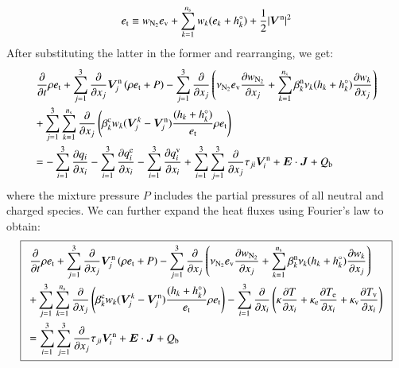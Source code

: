 \documentclass{warpdoc}
\newcommand\frameeqn[1]{\fbox{$\displaystyle #1$}}
\newcommand{\alb}{\vspace{0.1cm}\\} %
\newcommand{\mfd}{\displaystyle}
\newcommand{\ns}{{n_{\rm s}}}
\newcommand{\ev}{{e_{\rm v}}}
\renewcommand{\vec}[1]{\bm{#1}}
\begin{document}
%
\begin{equation}
e_{\rm t} \equiv w_{\rm N_2} \ev + \sum_{k=1}^\ns w_k (e_k + h_k^\circ) +\frac{1}{2} |\vec{V}^{\rm n}|^2
\end{equation}
%
After substituting the latter in the former and rearranging, we get:
%
\begin{equation}
\begin{array}{l}\mfd
 \frac{\partial }{\partial t}\rho e_{\rm t}
+ \sum_{j=1}^3  \frac{\partial }{\partial x_j} \vec{V}_j^{\rm n} \left(\rho  e_{\rm t} +  P \right)
- \sum_{j=1}^3  \frac{\partial }{\partial x_j} \left(
   \nu_{\rm N_2} \ev\frac{\partial w_{\rm N_2}}{\partial x_j} + \sum_{k=1}^\ns \beta_k^{\rm n} \nu_k (h_k+h_k^\circ)\frac{\partial w_k}{\partial x_j} 
\right)
 \alb\mfd
+ \sum_{j=1}^3 \sum_{k=1}^\ns  \frac{\partial }{\partial x_j} \left(
  \beta_k^{\rm c} w_k (\vec{V}^k_j-\vec{V}^{\rm n}_j) \frac{(h_k+h_k^\circ)}{e_{\rm t}} \rho e_{\rm t} 
\right)\alb\mfd
=
-\sum_{i=1}^{3}\frac{\partial q_i}{\partial x_i}
-  \sum_{i=1}^{3}\frac{\partial q_i^{\rm e}}{\partial x_i}
-\sum_{i=1}^{3}\frac{\partial q_i^{\rm v}}{\partial x_i}
+\sum_{i=1}^3 \sum_{j=1}^3  \frac{\partial }{\partial x_j} \tau_{ji} \vec{V}_i^{\rm n}
+ \vec{E}\cdot\vec{J}
+ Q_{\rm b}
\end{array}
\label{eqn:etotal7}
\end{equation}
%  
where the mixture pressure $P$ includes the partial pressures of all neutral and charged species. We can further expand the heat fluxes using Fourier's law to obtain:
%
\begin{equation}
\frameeqn{
\begin{array}{l}\mfd
 \frac{\partial }{\partial t}\rho e_{\rm t}
+ \sum_{j=1}^3  \frac{\partial }{\partial x_j} \vec{V}_j^{\rm n} \left(\rho  e_{\rm t} +  P \right)
- \sum_{j=1}^3  \frac{\partial }{\partial x_j} \left(
   \nu_{\rm N_2} \ev\frac{\partial w_{\rm N_2}}{\partial x_j} + \sum_{k=1}^\ns \beta_k^{\rm n} \nu_k (h_k+h_k^\circ)\frac{\partial w_k}{\partial x_j} 
\right)
 \alb\mfd
+ \sum_{j=1}^3 \sum_{k=1}^\ns  \frac{\partial }{\partial x_j} \left(
  \beta_k^{\rm c} w_k (\vec{V}^k_j-\vec{V}^{\rm n}_j) \frac{(h_k+h_k^\circ)}{e_{\rm t}} \rho e_{\rm t} 
\right)
-\sum_{i=1}^{3}\frac{\partial }{\partial x_i}\left(\kappa \frac{\partial T}{\partial x_i} + \kappa_{\rm e} \frac{\partial T_{\rm e}}{\partial x_i}+ \kappa_{\rm v} \frac{\partial T_{\rm v}}{\partial x_i}\right)
\alb\mfd
=
 \sum_{i=1}^3 \sum_{j=1}^3  \frac{\partial }{\partial x_j} \tau_{ji} \vec{V}_i^{\rm n}
+ \vec{E}\cdot\vec{J}
+ Q_{\rm b}
\end{array}
}
\label{eqn:etotal8}
\end{equation}
%  
\end{document}
